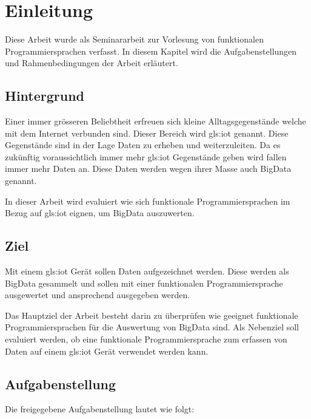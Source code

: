 
\chapter{Einleitung}
Diese Arbeit wurde als Seminararbeit zur Vorlesung von funktionalen Programmiersprachen verfasst.
In diesem Kapitel wird die Aufgabenstellungen und Rahmenbedingungen der Arbeit erläutert.


\section{Hintergrund}
Einer immer grösseren Beliebtheit erfreuen sich kleine Alltagsgegenstände welche mit dem Internet verbunden sind. Dieser Bereich wird \Gls{gls:iot} genannt. Diese Gegenstände sind in der Lage Daten zu erheben und weiterzuleiten. Da es zukünftig voraussichtlich immer mehr \Gls{gls:iot} Gegenstände geben wird fallen immer mehr Daten an. 
Diese Daten werden wegen ihrer Masse auch BigData genannt.

In dieser Arbeit wird evaluiert wie sich funktionale Programmiersprachen im Bezug auf \Gls{gls:iot} eignen, um BigData auszuwerten.


\section{Ziel}
Mit einem \Gls{gls:iot} Gerät sollen Daten aufgezeichnet werden. Diese werden als BigData gesammelt und sollen mit einer funktionalen Programmiersprache ausgewertet und ansprechend ausgegeben werden.

Das Hauptziel der Arbeit besteht darin zu überprüfen wie geeignet funktionale Programmiersprachen für die Auswertung von BigData sind. Als Nebenziel soll evaluiert werden, ob eine funktionale Programmiersprache zum erfassen von Daten auf einem \Gls{gls:iot} Gerät verwendet werden kann.

\section{Aufgabenstellung} \label{sec:Aufgabenstellung}
Die freigegebene Aufgabenstellung lautet wie folgt:

